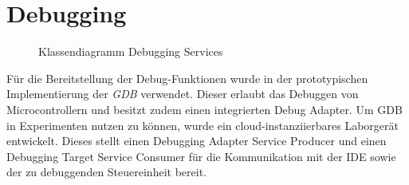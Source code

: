 \section{Debugging}\label{section:prototypische-implementierung:debugging}

\begin{figure}[tbp]
    \centering
    \caption{Klassendiagramm Debugging Services}
    \label{figure:klassendiagramm-debugging-services}
\end{figure}

Für die Bereitstellung der Debug-Funktionen wurde in der prototypischen Implementierung der \textit{\ac{GDB}} \cite{noauthor_gdb_nodate} verwendet. Dieser erlaubt das Debuggen von Microcontrollern und besitzt zudem einen integrierten Debug Adapter. Um \ac{GDB} in Experimenten nutzen zu können, wurde ein cloud-instanziierbares Laborgerät entwickelt. Dieses stellt einen Debugging Adapter Service Producer und einen Debugging Target Service Consumer für die Kommunikation mit der IDE sowie der zu debuggenden Steuereinheit bereit.

